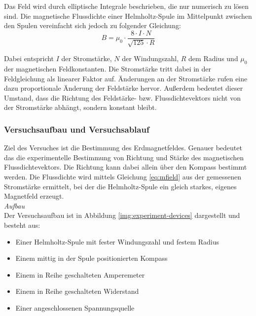 Das Feld wird durch elliptische Integrale beschrieben, die nur numerisch zu lösen sind.
Die magnetische Flussdichte einer Helmholtz-Spule im Mittelpunkt zwischen den Spulen vereinfacht sich jedoch zu folgender Gleichung:
\begin{equation}
\label{eq:mfield}
B = \mu_{0} \cdot \frac{8 \cdot I \cdot N}{\sqrt{125} \cdot R}
\end{equation}

Dabei entspricht $I$ der Stromstärke, $N$ der Windungszahl, $R$ dem Radius und $\mu_{0}$ der magnetischen Feldkonstanten. Die Stromstärke tritt dabei in der Feldgleichung als linearer Faktor auf. Änderungen an der Stromstärke rufen eine dazu proportionale Änderung der Feldstärke hervor. Außerdem bedeutet dieser Umstand, dass die Richtung des Feldstärke- bzw. Flussdichtevektors nicht von der Stromstärke abhängt, sondern konstant bleibt.\\

\subsubsection{Versuchsaufbau und Versuchsablauf}
\label{sec-2-3-4}
Ziel des Versuches ist die Bestimmung des Erdmagnetfeldes. Genauer bedeutet das die experimentelle Bestimmung von Richtung und Stärke des magnetischen Flussdichtevektors. Die Richtung kann dabei allein über den Kompass bestimmt werden. Die Flussdichte wird mittels Gleichung \ref{eq:mfield} aus der gemessenen Stromstärke ermittelt, bei der die Helmholtz-Spule ein gleich starkes, eigenes Magnetfeld erzeugt.\\

\textit{Aufbau}\\
Der Versuchsaufbau ist in Abbildung \ref{img:experiment-devices} dargestellt und besteht aus: 
\begin{itemize}
	\setlength{\itemsep}{-5pt}
	\item Einer Helmholtz-Spule mit fester Windungszahl und festem Radius
	\item Einem mittig in der Spule positionierten Kompass
	\item Einem in Reihe geschalteten Amperemeter
	\item Einem in Reihe geschalteten Widerstand	
	\item Einer angeschlossenen Spannungsquelle
\end{itemize}

